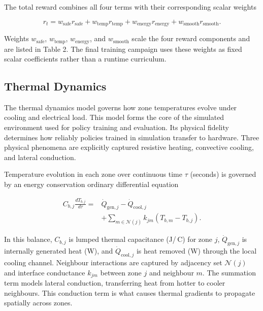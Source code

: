 \documentclass[twocolumn]{article}
\begin{document}
The total reward combines all four terms with their corresponding scalar weights

\begin{equation}
r_t = w_{\mathrm{safe}} r_{\mathrm{safe}} + w_{\mathrm{temp}} r_{\mathrm{temp}} + w_{\mathrm{energy}} r_{\mathrm{energy}} + w_{\mathrm{smooth}} r_{\mathrm{smooth}}. \label{eq:rtotal}
\end{equation}

Weights $w_{\mathrm{safe}}$, $w_{\mathrm{temp}}$, $w_{\mathrm{energy}}$, and $w_{\mathrm{smooth}}$ scale the four reward components and are listed in Table 2. The final training campaign uses these weights as fixed scalar coefficients rather than a runtime curriculum.

\subsection*{Thermal Dynamics}

The thermal dynamics model governs how zone temperatures evolve under cooling and electrical load. This model forms the core of the simulated environment used for policy training and evaluation. Its physical fidelity determines how reliably policies trained in simulation transfer to hardware. Three physical phenomena are explicitly captured resistive heating, convective cooling, and lateral conduction.

Temperature evolution in each zone over continuous time $\tau$ (seconds) is governed by an energy conservation ordinary differential equation

\begin{equation}
\begin{split}
C_{b,j} \frac{dT_{b,j}}{d\tau} = &\dot Q_{\mathrm{gen},j} - \dot Q_{\mathrm{cool},j} \\
&+ \sum_{m \in \mathcal{N}(j)} k_{jm}(T_{b,m} - T_{b,j}). 
\end{split}
\label{eq:energy_balance}
\end{equation}

In this balance, $C_{b,j}$ is lumped thermal capacitance (J/\,\textdegree{}C) for zone $j$, $\dot Q_{\mathrm{gen},j}$ is internally generated heat (W), and $\dot Q_{\mathrm{cool},j}$ is heat removed (W) through the local cooling channel. Neighbour interactions are captured by adjacency set $\mathcal{N}(j)$ and interface conductance $k_{jm}$ between zone $j$ and neighbour $m$. The summation term models lateral conduction, transferring heat from hotter to cooler neighbours. This conduction term is what causes thermal gradients to propagate spatially across zones.
\end{document}
